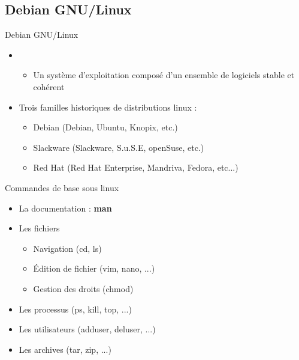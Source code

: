 \subsection{Debian GNU/Linux}
\begin{frame}{Debian GNU/Linux}

\begin{itemize}
\item 
\begin{itemize} \item Un système d'exploitation composé d'un ensemble de logiciels stable et cohérent  \end{itemize}
\item Trois familles historiques de distributions linux :
  \begin{itemize}
    \item Debian (Debian, Ubuntu, Knopix, etc.)
    \item Slackware (Slackware, S.u.S.E, openSuse, etc.)
    \item Red Hat (Red Hat Enterprise, Mandriva, Fedora, etc...)
  \end{itemize}
\end{itemize}

\end{frame}


\begin{frame}{Commandes de base sous linux}

\begin{itemize}
  \item La documentation : \textbf{man}
  \item Les fichiers
  \begin{itemize}
    \item Navigation (cd, ls)
    \item Édition de fichier (vim, nano, ...)
    \item Gestion des droits (chmod)
  \end{itemize}
  \item Les processus (ps, kill, top, ...)
  \item Les utilisateurs (adduser, deluser, ...)
  \item Les archives (tar, zip, ...)
\end{itemize}

\end{frame}


